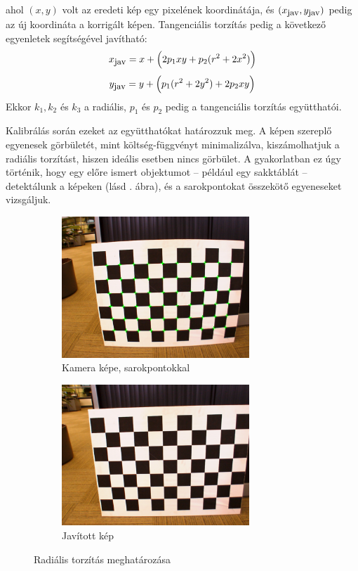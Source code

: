 ahol $(x,y)$ volt az eredeti kép egy pixelének koordinátája, és $(x_{\hbox{\small jav}}, y_{\hbox{\small jav}})$ pedig az új koordináta a korrigált képen. Tangenciális torzítás pedig a következő egyenletek segítségével javítható:
\[x_{\hbox{\small jav}} = x + \Big(2p_1xy + p_2(r^2+2x^2)\Big)\]
\[y_{\hbox{\small jav}} = y + \Big(p_1(r^2+2y^2) + 2p_2xy\Big)\]
Ekkor $k_1, k_2$ és $k_3$ a radiális, $p_1$ és $p_2$ pedig a tangenciális torzítás együtthatói.

Kalibrálás során ezeket az együtthatókat határozzuk meg. A képen szereplő egyenesek görbületét, mint költség-függvényt minimalizálva, kiszámolhatjuk a radiális torzítást, hiszen ideális esetben nincs görbület. A gyakorlatban ez úgy történik, hogy egy előre ismert objektumot -- például egy sakktáblát -- detektálunk a képeken (lásd . ábra), és a sarokpontokat összekötő egyeneseket vizsgáljuk.

\begin{figure}[tbh]
\centering
\begin{subfigure}[b]{0.49\linewidth}
	\centering
	\includegraphics[width=200pt]{figures/distorted.png}
	\caption{Kamera képe, sarokpontokkal}
  \end{subfigure}
\begin{subfigure}[b]{0.49\linewidth}
	\centering
	\includegraphics[width=200pt]{figures/undistorted.png}
	\caption{Javított kép}
  \end{subfigure}
\caption{Radiális torzítás meghatározása \cite{pinhole-model} \label{fig:chessboards}}
\end{figure}

